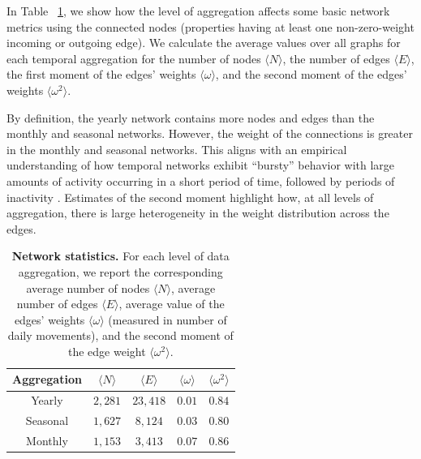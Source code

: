 \documentclass[aps,physrev,reprint,superscriptaddress]{revtex4-1}
\begin{document}
 In Table ~\ref{tab:net_stats}, we show how the level of aggregation affects some basic network metrics using the connected nodes (properties having at least one non-zero-weight incoming or outgoing edge). We calculate the average values over all graphs for each temporal aggregation for the number of nodes $\langle N \rangle$, the number of edges $ \langle E \rangle$, the first moment of the edges' weights $\langle \omega \rangle$, and the second moment of the edges' weights $\langle \omega^2 \rangle$. 

 By definition, the yearly network contains more nodes and edges than the monthly and seasonal networks. However, the weight of the connections is greater in the monthly and seasonal networks. This aligns with an empirical understanding of how temporal networks exhibit ``bursty'' behavior with large amounts of activity occurring in a short period of time, followed by periods of inactivity \cite{sheng2023constructing}.  
Estimates of the second moment highlight how, at all levels of aggregation, there is large heterogeneity in the weight distribution across the edges. 

  

\begin{table}[!htb]
    \centering
    \renewcommand{\arraystretch}{1.2}
\setlength{\tabcolsep}{8pt}
    \begin{tabular}{|c|c|c|c|c|}
        \hline
        \textbf{Aggregation} & \textbf{$\langle N \rangle$} & {$\langle E \rangle$} & \textbf{$\langle \omega \rangle$} & \textbf{$\langle \omega^2 \rangle$}\\
        \hline
        Yearly & $2,281$ & $23,418$ & $0.01$ & $0.84$  \\ 
        \hline
        Seasonal  & $1,627$ & $8,124$   & $0.03$ & $0.80$   \\
        \hline
        Monthly  & $1,153$ & $3,413$   & $0.07$ & $0.86$    \\
        \hline
    \end{tabular}
     \caption{\textbf{Network statistics.} For each level of data aggregation, we report the corresponding average number of nodes $\langle N \rangle$, average number of edges $\langle E \rangle$, average value of the edges' weights $ \langle \omega \rangle$ (measured in number of daily movements), and the second moment of the edge weight  $\langle \omega^2 \rangle$.}
    \label{tab:net_stats}
\end{table}
\end{document}
